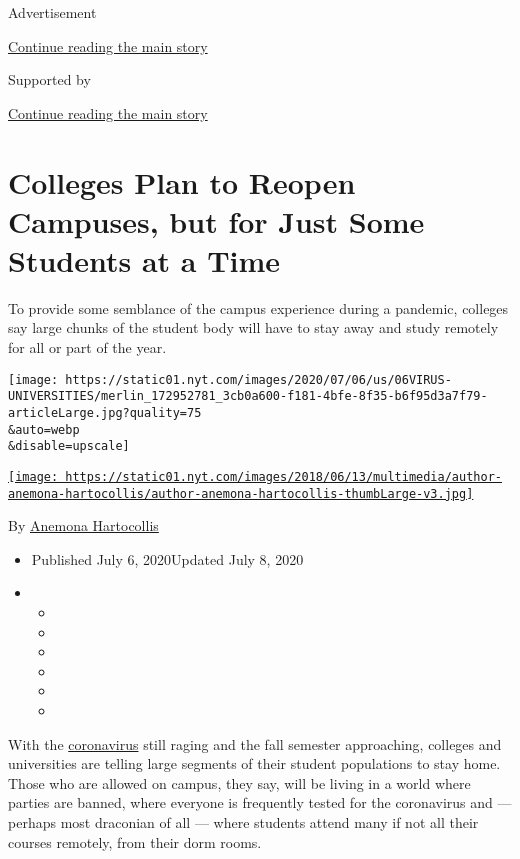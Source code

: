 Advertisement

\protect\hyperlink{after-top}{Continue reading the main story}

Supported by

\protect\hyperlink{after-sponsor}{Continue reading the main story}

\hypertarget{colleges-plan-to-reopen-campuses-but-for-just-some-students-at-a-time}{%
\section{Colleges Plan to Reopen Campuses, but for Just Some Students at
a
Time}\label{colleges-plan-to-reopen-campuses-but-for-just-some-students-at-a-time}}

To provide some semblance of the campus experience during a pandemic,
colleges say large chunks of the student body will have to stay away and
study remotely for all or part of the year.

\texttt{[image: https://static01.nyt.com/images/2020/07/06/us/06VIRUS-UNIVERSITIES/merlin\_172952781\_3cb0a600-f181-4bfe-8f35-b6f95d3a7f79-articleLarge.jpg?quality=75\\\&auto=webp\\\&disable=upscale]}

\href{https://www.nytimes.com/by/anemona-hartocollis}{\texttt{[image: https://static01.nyt.com/images/2018/06/13/multimedia/author-anemona-hartocollis/author-anemona-hartocollis-thumbLarge-v3.jpg]}}

By \href{https://www.nytimes.com/by/anemona-hartocollis}{Anemona
Hartocollis}

\begin{itemize}
\item
  Published July 6, 2020Updated July 8, 2020
\item
  \begin{itemize}
  \item
  \item
  \item
  \item
  \item
  \item
  \end{itemize}
\end{itemize}

With the
\href{https://www.nytimes.com/2020/07/08/sports/coronavirus-stanford-cuts.html}{coronavirus}
still raging and the fall semester approaching, colleges and
universities are telling large segments of their student populations to
stay home. Those who are allowed on campus, they say, will be living in
a world where parties are banned, where everyone is frequently tested
for the coronavirus and --- perhaps most draconian of all --- where
students attend many if not all their courses remotely, from their dorm
rooms.


